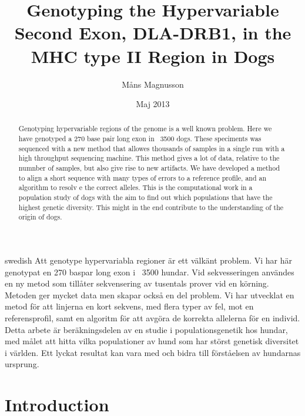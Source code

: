 \documentclass[a4paper,11pt]{kth-mag}
\title{Genotyping the Hypervariable Second Exon, DLA-DRB1, in the MHC type II Region in Dogs}
\author{Måns Magnusson}
\date{Maj 2013}
\begin{document}
\large

\ifpdf
{}
\else
{}
\fi
	

\frontmatter
\pagestyle{empty}
\removepagenumbers
\maketitle
{}
\begin{abstract}
Genotyping hypervariable regions of the genome is a well known problem. Here we have genotyped a 270 base pair long exon in ~3500 dogs. These speciments was sequenced with a new method that allowes thousands of samples in a single run with a high throughput sequencing machine. This method gives a lot of data, relative to the numnber of samples, but also give rise to new artifacts. We have developed a method to align a short sequence with many types of errors to a reference profile, and an algorithm to resolv	e the correct alleles. This is the computational work in a population study of dogs with the aim to find out which populations that have the highest genetic diversity. This might in the end contribute to the understanding of the origin of dogs.
\end{abstract}


\begin{foreignabstract}{swedish}
Att genotype hypervariabla regioner är ett välkänt problem. Vi har här genotypat en 270 baspar long exon i ~3500 hundar. Vid sekvesseringen användes en ny metod som tillåter sekvensering av tusentals prover vid en körning. Metoden ger mycket data men skapar också en del problem. Vi har utvecklat en metod för att linjerna en kort sekvens, med flera typer av fel, mot en referensprofil, samt en algoritm för att avgöra de korrekta allelerna för en individ. Detta arbete är beräkningsdelen av en studie i populationsgenetik hos hundar, med målet att hitta vilka populationer av hund som har störst genetisk diversitet i världen. Ett lyckat resultat kan vara med och bidra till förståelsen av hundarnas ursprung.
\end{foreignabstract}

\clearpage

\tableofcontents*

\mainmatter

\pagestyle{newchap}

\chapter{Introduction}
\end{document}
